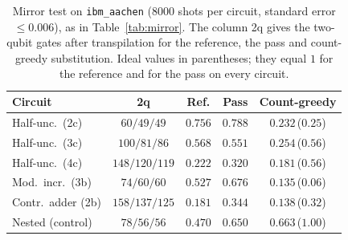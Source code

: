 \begin{table}[t]
\centering\footnotesize
\caption{Mirror test on \texttt{ibm\_aachen} ($8000$ shots per circuit, standard error
$\le0.006$), as in Table~\ref{tab:mirror}. The column 2q gives the
two-qubit gates after transpilation for the reference, the pass and count-greedy substitution. Ideal values in parentheses;
they equal $1$ for the reference and for the pass on every circuit.}
\label{tab:mirror2}
\setlength{\tabcolsep}{1.6pt}
\begin{tabular}{lcccc}
\toprule
Circuit & 2q & Ref. & Pass & Count-greedy \\
\midrule
Half-unc.\ (2c) & $60/49/49$ & $0.756$ & $0.788$ & $0.232$\,($0.25$) \\
Half-unc.\ (3c) & $100/81/86$ & $0.568$ & $0.551$ & $0.254$\,($0.56$) \\
Half-unc.\ (4c) & $148/120/119$ & $0.222$ & $0.320$ & $0.181$\,($0.56$) \\
Mod.\ incr.\ (3b) & $74/60/60$ & $0.527$ & $0.676$ & $0.135$\,($0.06$) \\
Contr.\ adder (2b) & $158/137/125$ & $0.181$ & $0.344$ & $0.138$\,($0.32$) \\
Nested (control) & $78/56/56$ & $0.470$ & $0.650$ & $0.663$\,($1.00$) \\
\bottomrule
\end{tabular}
\end{table}
